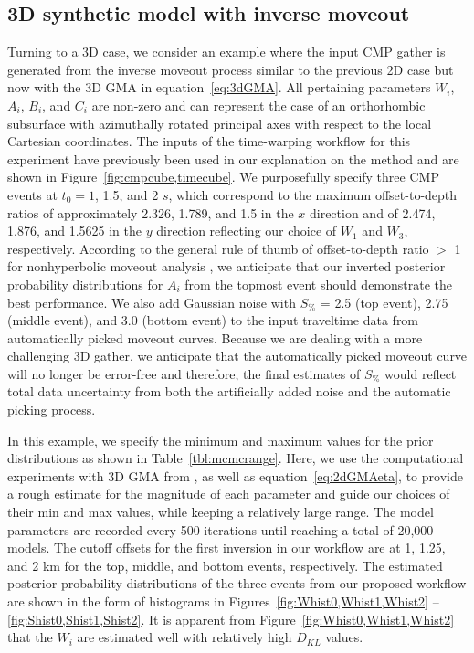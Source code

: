 

\subsection{3D synthetic model with inverse moveout}
Turning to a 3D case, we consider an example where the input CMP gather is generated from the inverse moveout process similar to the previous 2D case but now with the 3D GMA in equation~\ref{eq:3dGMA}. All pertaining parameters $W_i$, $A_i$, $B_i$, and $C_i$ are non-zero and can represent the case of an orthorhombic subsurface with azimuthally rotated principal axes with respect to the local Cartesian coordinates. The inputs of the time-warping workflow for this experiment have previously been used in our explanation on the method and are shown in Figure~\ref{fig:cmpcube,timecube}. We purposefully specify three CMP events at $t_0=1$, 1.5, and 2 $s$, which correspond to the maximum offset-to-depth ratios of approximately 2.326, 1.789, and 1.5 in the $x$ direction and of 2.474, 1.876, and 1.5625 in the $y$ direction reflecting our choice of $W_1$ and $W_3$, respectively. According to the general rule of thumb of offset-to-depth ratio $>$ 1 for nonhyperbolic moveout analysis \cite[]{alkava,tsvankinbook,thomsenbook}, we anticipate that our inverted posterior probability distributions for $A_i$ from the topmost event should demonstrate the best performance. We also add Gaussian noise with $S_{\%}$ = 2.5 (top event), 2.75 (middle event), and 3.0 (bottom event) to the input traveltime data from automatically picked moveout curves. Because we are dealing with a more challenging 3D gather, we anticipate that the automatically picked moveout curve will no longer be error-free and therefore, the final estimates of $S_{\%}$ would reflect total data uncertainty from both the artificially added noise and the automatic picking process.

In this example, we specify the minimum and maximum values for the prior distributions as shown in Table~\ref{tbl:mcmcrange}. Here, we use the computational experiments with 3D GMA from \cite{zonegma}, as well as equation~\ref{eq:2dGMAeta}, to provide a rough estimate for the magnitude of each parameter and guide our choices of their min and max values, while keeping a relatively large range. The model parameters are recorded every 500 iterations until reaching a total of 20,000 models. The cutoff offsets for the first inversion in our workflow are at 1, 1.25, and 2 km for the top, middle, and bottom events, respectively. The estimated posterior probability distributions of the three events from our proposed workflow are shown in the form of histograms in Figures~\ref{fig:Whist0,Whist1,Whist2} -- \ref{fig:Shist0,Shist1,Shist2}. It is apparent from  Figure~\ref{fig:Whist0,Whist1,Whist2} that the $W_i$ are estimated well with relatively high $D_{KL}$ values.

